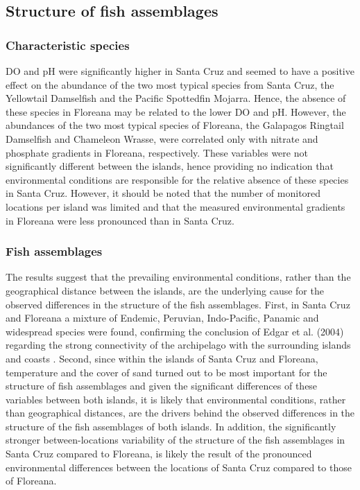 \subsection{Structure of fish assemblages}

\subsubsection{Characteristic species}

DO and pH were significantly higher in Santa Cruz and seemed to have a positive effect on the abundance of the two most typical species from Santa Cruz, the Yellowtail Damselfish and the Pacific Spottedfin Mojarra. Hence, the absence of these species in Floreana may be related to the lower DO and pH. However, the abundances of the two most typical species of Floreana, the Galapagos Ringtail Damselfish and Chameleon Wrasse, were correlated only with nitrate and phosphate gradients in Floreana, respectively. These variables were not significantly different between the islands, hence providing no indication that environmental conditions are responsible for the relative absence of these species in Santa Cruz. However, it should be noted that the number of monitored locations per island was limited and that the measured environmental gradients in Floreana were less pronounced than in Santa Cruz.

\subsubsection{Fish assemblages}

The results suggest that the prevailing environmental conditions, rather than the geographical distance between the islands, are the underlying cause for the observed differences in the structure of the fish assemblages. First, in Santa Cruz and Floreana a mixture of Endemic, Peruvian, Indo-Pacific, Panamic and widespread species were found, confirming the conclusion of Edgar et al. (2004) regarding the strong connectivity of the archipelago with the surrounding islands and coasts \citep{Edgar2004}. Second, since within the islands of Santa Cruz and Floreana, temperature and the cover of sand turned out to be most important for the structure of fish assemblages and given the significant differences of these variables between both islands, it is likely that environmental conditions, rather than geographical distances, are the drivers behind the observed differences in the structure of the fish assemblages of both islands. In addition, the significantly stronger between-locations variability of the structure of the fish assemblages in Santa Cruz compared to Floreana, is likely the result of the pronounced environmental differences between the locations of Santa Cruz compared to those of Floreana. %

